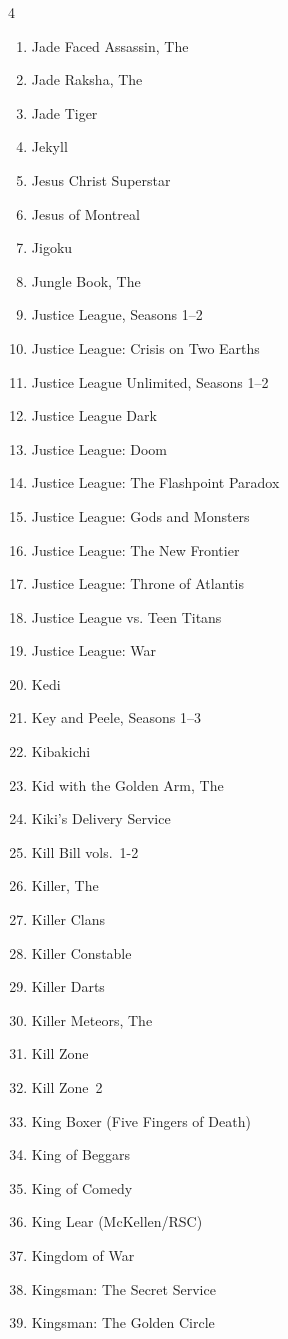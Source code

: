 \documentclass{article}
\begin{document}
\begin{multicols}{4}
\begin{enumerate}
\item Jade Faced Assassin, The
\item Jade Raksha, The
\item Jade Tiger
\item Jekyll
\item Jesus Christ Superstar
\item Jesus of Montreal
\item Jigoku
\item Jungle Book, The
\item Justice League, Seasons 1--2
\item Justice League: Crisis on Two Earths
\item Justice League Unlimited, Seasons 1--2
\item Justice League Dark
\item Justice League: Doom
\item Justice League: The Flashpoint Paradox
\item Justice League: Gods and Monsters
\item Justice League: The New Frontier
\item Justice League: Throne of Atlantis
\item Justice League vs. Teen Titans
\item Justice League: War
\item Kedi
\item Key and Peele, Seasons 1--3
\item Kibakichi
\item Kid with the Golden Arm, The
\item Kiki's Delivery Service
\item Kill Bill vols.~1-2
\item Killer, The
\item Killer Clans
\item Killer Constable
\item Killer Darts
\item Killer Meteors, The
\item Kill Zone
\item Kill Zone~2
\item King Boxer (Five Fingers of Death)
\item King of Beggars
\item King of Comedy
\item King Lear (McKellen/RSC)
\item Kingdom of War
\item Kingsman: The Secret Service
\item Kingsman: The Golden Circle

\end{enumerate}
\end{multicols}
\end{document}
